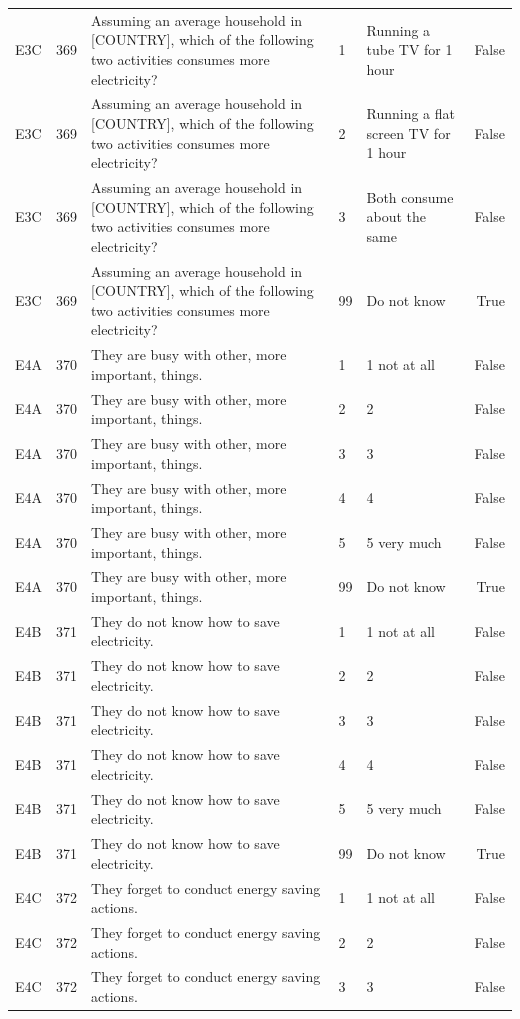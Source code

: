 \begin{tabular}{lrlllr}
E3C & 369 & Assuming an average household in [COUNTRY], which of the following two activities consumes more electricity? & 1 & Running a tube TV for 1 hour & False \\
E3C & 369 & Assuming an average household in [COUNTRY], which of the following two activities consumes more electricity? & 2 & Running a flat screen TV for 1 hour & False \\
E3C & 369 & Assuming an average household in [COUNTRY], which of the following two activities consumes more electricity? & 3 & Both consume about the same & False \\
E3C & 369 & Assuming an average household in [COUNTRY], which of the following two activities consumes more electricity? & 99 & Do not know & True \\
E4A & 370 & They are busy with other, more important, things. & 1 & 1 not at all & False \\
E4A & 370 & They are busy with other, more important, things. & 2 & 2 & False \\
E4A & 370 & They are busy with other, more important, things. & 3 & 3 & False \\
E4A & 370 & They are busy with other, more important, things. & 4 & 4 & False \\
E4A & 370 & They are busy with other, more important, things. & 5 & 5 very much & False \\
E4A & 370 & They are busy with other, more important, things. & 99 & Do not know & True \\
E4B & 371 & They do not know how to save electricity. & 1 & 1 not at all & False \\
E4B & 371 & They do not know how to save electricity. & 2 & 2 & False \\
E4B & 371 & They do not know how to save electricity. & 3 & 3 & False \\
E4B & 371 & They do not know how to save electricity. & 4 & 4 & False \\
E4B & 371 & They do not know how to save electricity. & 5 & 5 very much & False \\
E4B & 371 & They do not know how to save electricity. & 99 & Do not know & True \\
E4C & 372 & They forget to conduct energy saving actions. & 1 & 1 not at all & False \\
E4C & 372 & They forget to conduct energy saving actions. & 2 & 2 & False \\
E4C & 372 & They forget to conduct energy saving actions. & 3 & 3 & False \\

\end{tabular}

